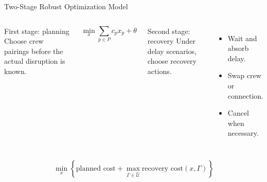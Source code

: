 \documentclass[aspectratio=169]{beamer}
\begin{document}
\begin{frame}{Two-Stage Robust Optimization Model}
  \begin{columns}[T,onlytextwidth]
      \begin{block}{First stage: planning}
        Choose crew pairings before the actual disruption is known.
      \end{block}
      \[
        \min_x \sum_{p \in P} c_p x_p + \theta
      \]

      \begin{block}{Second stage: recovery}
        Under delay scenarios, choose recovery actions.
      \end{block}
      \begin{itemize}
        \item Wait and absorb delay.
        \item Swap crew or connection.
        \item Cancel when necessary.
      \end{itemize}
  \end{columns}

  \vspace{0.25cm}
  \[
    \min_x \left\{ \text{planned cost}
    + \max_{\Gamma \in \hat{\mathcal U}}
    \text{recovery cost}(x,\Gamma) \right\}
  \]
\end{frame}
\end{document}

